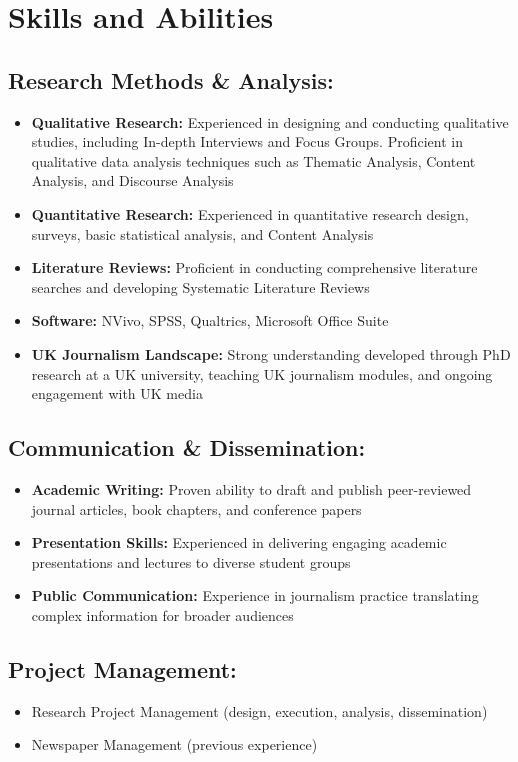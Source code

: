 \documentclass[a4paper,11pt]{article}
\newcommand{\resumeItem}[1]{
  \item\small{
    {#1 \vspace{-2pt}}
  }
}
\newcommand{\resumeItemListStart}{\begin{itemize}}
\newcommand{\resumeItemListEnd}{\end{itemize}\vspace{-5pt}}
\begin{document}
\section{Skills and Abilities}

\subsection{Research Methods \& Analysis:}
    \resumeItemListStart
        \resumeItem{\textbf{Qualitative Research:} Experienced in designing and conducting qualitative studies, including In-depth Interviews and Focus Groups. Proficient in qualitative data analysis techniques such as Thematic Analysis, Content Analysis, and Discourse Analysis}
        \resumeItem{\textbf{Quantitative Research:} Experienced in quantitative research design, surveys, basic statistical analysis, and Content Analysis}
        \resumeItem{\textbf{Literature Reviews:} Proficient in conducting comprehensive literature searches and developing Systematic Literature Reviews}
        \resumeItem{\textbf{Software:} NVivo, SPSS, Qualtrics, Microsoft Office Suite}
        \resumeItem{\textbf{UK Journalism Landscape:} Strong understanding developed through PhD research at a UK university, teaching UK journalism modules, and ongoing engagement with UK media}
    \resumeItemListEnd

\subsection{Communication \& Dissemination:}
    \resumeItemListStart
        \resumeItem{\textbf{Academic Writing:} Proven ability to draft and publish peer-reviewed journal articles, book chapters, and conference papers}
        \resumeItem{\textbf{Presentation Skills:} Experienced in delivering engaging academic presentations and lectures to diverse student groups}
        \resumeItem{\textbf{Public Communication:} Experience in journalism practice translating complex information for broader audiences}
    \resumeItemListEnd

\subsection{Project Management:}
    \resumeItemListStart
        \resumeItem{Research Project Management (design, execution, analysis, dissemination)}
        \resumeItem{Newspaper Management (previous experience)}
    \resumeItemListEnd
\end{document}
